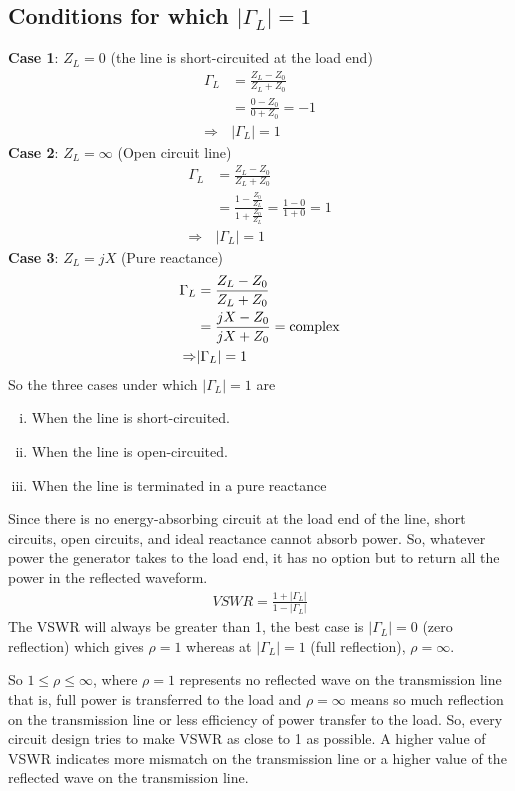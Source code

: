 \subsection{Conditions for which $|\Gamma_L|=1$}
\textbf{Case 1}: $Z_L=0$ (the line is short-circuited at the load end)
\begin{align*}	
\Gamma_L&= \frac{Z_L -Z_0}{Z_L + Z_0}\\
&= \frac{0 -Z_0}{0 + Z_0} = -1\\
\Rightarrow&|\Gamma_L|=1
\end{align*}	
\textbf{Case 2}: $Z_L=\infty$ (Open circuit line)
\begin{align*}
\Gamma_L&= \frac{Z_L -Z_0}{Z_L + Z_0}\\
&= \frac{1 -\frac{Z_0}{Z_L}}{1 + \frac{Z_0}{Z_L}} = \frac{1 - 0}{1 + 0} = 1\\
\Rightarrow&|\Gamma_L| = 1
\end{align*}
\textbf{Case 3}: $Z_L = j X$ (Pure reactance)
\begin{align*}
\Gamma_L &= \frac{Z_L -Z_0}{Z_L + Z_0}\\
&= \frac{j X - Z_0}{j X + Z_0} = \textnormal{complex}\\
\Rightarrow&|\Gamma_L| = 1
\end{align*}
So the three cases under which $|\Gamma_L|=1$ are
\begin{enumerate}[(i)]
\item When the line is short-circuited.
\item When the line is open-circuited.
\item When the line is terminated in a pure reactance
\end{enumerate}
Since there is no energy-absorbing circuit at the load end of the line, short circuits, open circuits, and ideal reactance cannot absorb power. So, whatever power the generator takes to the load end, it has no option but to return all the power in the reflected waveform.
\begin{align*}
VSWR = \frac{1+|\Gamma_L|}{1-|\Gamma_L|}
\end{align*}
The VSWR will always be greater than 1, the best case is $|\Gamma_L|=0$ (zero reflection) which gives $\rho=1$ whereas at $|\Gamma_L|=1$ (full reflection), $\rho= \infty$.

So $1\leq\rho\leq\infty$, where $\rho=1$ represents no reflected wave on the transmission line that is, full power is transferred to the load and $\rho = \infty$ means so much reflection on the transmission line or less efficiency of power transfer to the load. So, every circuit design tries to make VSWR as close to 1 as possible. A higher value of VSWR indicates more mismatch on the transmission line or a higher value of the reflected wave on the transmission line.

